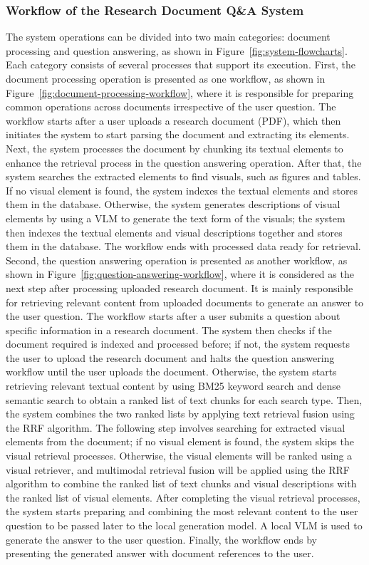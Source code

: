 \documentclass[11pt,a4paper]{report}
\begin{document}
\subsubsection{Workflow of the Research Document Q\&A System}
The system operations can be divided into two main categories: document processing and question answering, as shown in Figure~\ref{fig:system-flowcharts}. Each category consists of several processes that support its execution. First, the document processing operation is presented as one workflow, as shown in Figure~\ref{fig:document-processing-workflow}, where it is responsible for preparing common operations across documents irrespective of the user question. The workflow starts after a user uploads a research document (\ac{PDF}), which then initiates the system to start parsing the document and extracting its elements. Next, the system processes the document by chunking its textual elements to enhance the retrieval process in the question answering operation. After that, the system searches the extracted elements to find visuals, such as figures and tables. If no visual element is found, the system indexes the textual elements and stores them in the database. Otherwise, the system generates descriptions of visual elements by using a \ac{VLM} to generate the text form of the visuals; the system then indexes the textual elements and visual descriptions together and stores them in the database. The workflow ends with processed data ready for retrieval.\\

Second, the question answering operation is presented as another workflow, as shown in Figure~\ref{fig:question-answering-workflow}, where it is considered as the next step after processing uploaded research document. It is mainly responsible for retrieving relevant content from uploaded documents to generate an answer to the user question. The workflow starts after a user submits a question about specific information in a research document. The system then checks if the document required is indexed and processed before; if not, the system requests the user to upload the research document and halts the question answering workflow until the user uploads the document. Otherwise, the system starts retrieving relevant textual content by using \ac{BM25} keyword search and dense semantic search to obtain a ranked list of text chunks for each search type. Then, the system combines the two ranked lists by applying text retrieval fusion using the \ac{RRF} algorithm. The following step involves searching for extracted visual elements from the document; if no visual element is found, the system skips the visual retrieval processes. Otherwise, the visual elements will be ranked using a visual retriever, and multimodal retrieval fusion will be applied using the \ac{RRF} algorithm to combine the ranked list of text chunks and visual descriptions with the ranked list of visual elements. After completing the visual retrieval processes, the system starts preparing and combining the most relevant content to the user question to be passed later to the local generation model. A local \ac{VLM} is used to generate the answer to the user question. Finally, the workflow ends by presenting the generated answer with document references to the user.
\end{document}
